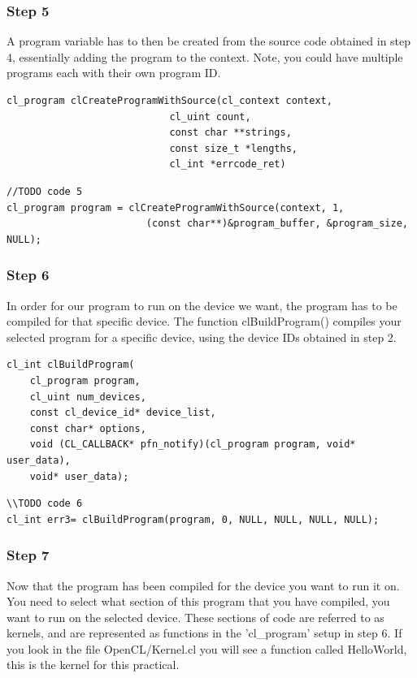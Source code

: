 \subsubsection{Step 5}
A program variable has to then be created from the source code obtained in step 4, essentially adding the program to the context. Note, you could have multiple programs each with their own program ID.
\begin{lstlisting}
cl_program clCreateProgramWithSource(cl_context context,
							cl_uint count, 
							const char **strings, 
							const size_t *lengths, 
							cl_int *errcode_ret)	
\end{lstlisting}

\begin{lstlisting}
//TODO code 5
cl_program program = clCreateProgramWithSource(context, 1, 
                        (const char**)&program_buffer, &program_size, NULL);
\end{lstlisting}

\subsubsection{Step 6}
In order for our program to run on the device we want, the program has to be compiled for that specific device. The function clBuildProgram() compiles your selected program for a specific device, using the device IDs obtained in step 2.

\begin{lstlisting}
cl_int clBuildProgram(
    cl_program program,
    cl_uint num_devices,
    const cl_device_id* device_list,
    const char* options,
    void (CL_CALLBACK* pfn_notify)(cl_program program, void* user_data),
    void* user_data);
\end{lstlisting}

\begin{lstlisting}
\\TODO code 6
cl_int err3= clBuildProgram(program, 0, NULL, NULL, NULL, NULL);
\end{lstlisting}

\subsubsection{Step 7}
Now that the program has been compiled for the device you want to run it on. You need to select what section of this program that you have compiled, you want to run on the selected device. These sections of code are referred to as kernels, and are represented as functions in the 'cl\_program' setup in step 6. If you look in the file OpenCL/Kernel.cl you will see a function called HelloWorld, this is the kernel for this practical.

